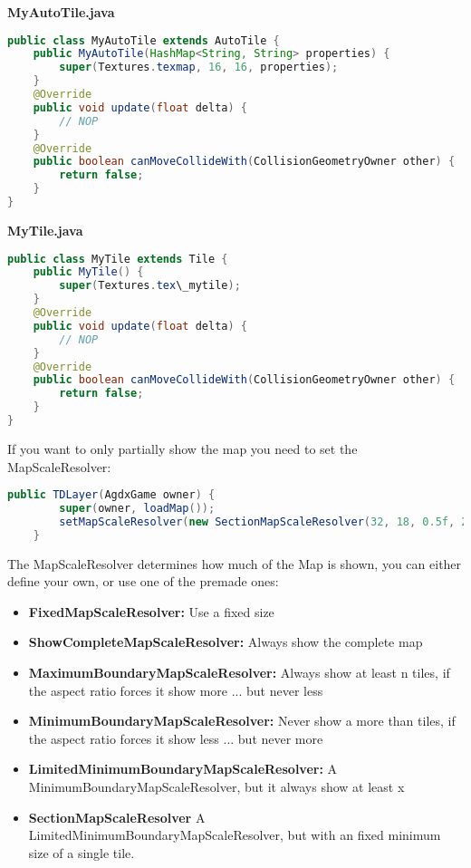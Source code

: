 \textbf{MyAutoTile.java}

\doinline
\begin{lstlisting}[caption=Markdown Tutorial: fenced code block, title=\hspace{0 pt}, language=java]
public class MyAutoTile extends AutoTile {
	public MyAutoTile(HashMap<String, String> properties) {
		super(Textures.texmap, 16, 16, properties);
	}
	@Override
	public void update(float delta) {
		// NOP
	}
	@Override
	public boolean canMoveCollideWith(CollisionGeometryOwner other) {
		return false;
	}
}
\end{lstlisting}

\textbf{MyTile.java}

\doinline
\begin{lstlisting}[caption=Markdown Tutorial: fenced code block, title=\hspace{0 pt}, language=java]
public class MyTile extends Tile {
	public MyTile() {
		super(Textures.tex\_mytile);
	}
	@Override
	public void update(float delta) {
		// NOP
	}
	@Override
	public boolean canMoveCollideWith(CollisionGeometryOwner other) {
		return false;
	}
}
\end{lstlisting}

If you want to only partially show the map you need to set the MapScaleResolver:

\doinline
\begin{lstlisting}[caption=Markdown Tutorial: fenced code block, title=\hspace{0 pt}, language=java]
	public TDLayer(AgdxGame owner) {
		super(owner, loadMap());
		setMapScaleResolver(new SectionMapScaleResolver(32, 18, 0.5f, 20f));
	}
\end{lstlisting}

The MapScaleResolver determines how much of the Map is shown, you can either define your own, or use one of the premade ones:

\begin{itemize}
\item \textbf{FixedMapScaleResolver:} Use a fixed size
\item \textbf{ShowCompleteMapScaleResolver:} Always show the complete map
\item \textbf{MaximumBoundaryMapScaleResolver:} Always show at least n tiles, if the aspect ratio forces it show more ... but never less
\item \textbf{MinimumBoundaryMapScaleResolver:} Never show a more than tiles, if the aspect ratio forces it show less ... but never more
\item \textbf{LimitedMinimumBoundaryMapScaleResolver:} A MinimumBoundaryMapScaleResolver, but it always show at least x%
\item \textbf{SectionMapScaleResolver} A LimitedMinimumBoundaryMapScaleResolver, but with an fixed minimum size of a single tile.
\end{itemize}

